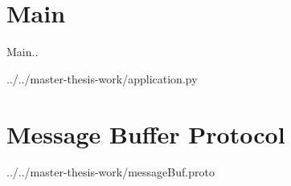 \section{Main}\label{apx:main-code}

Main..

\begin{lstinputlisting}
[language=Python]{../../master-thesis-work/application.py}
\end{lstinputlisting}

\section{Message Buffer Protocol}\label{apx:msgBuf-code}
\begin{lstinputlisting}
[language=XML]{../../master-thesis-work/messageBuf.proto}
\end{lstinputlisting}